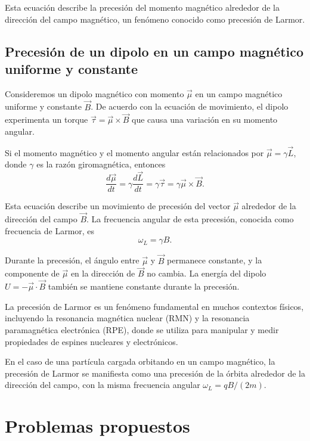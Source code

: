 \documentclass[12pt,a4paper]{book}
\begin{document}
Esta ecuación describe la precesión del momento magnético alrededor de la dirección del campo magnético, un fenómeno conocido como precesión de Larmor.

\subsection{Precesión de un dipolo en un campo magnético uniforme y constante}

Consideremos un dipolo magnético con momento $\vec{\mu}$ en un campo magnético uniforme y constante $\vec{B}$. De acuerdo con la ecuación de movimiento, el dipolo experimenta un torque $\vec{\tau} = \vec{\mu} \times \vec{B}$ que causa una variación en su momento angular.

Si el momento magnético y el momento angular están relacionados por $\vec{\mu} = \gamma \vec{L}$, donde $\gamma$ es la razón giromagnética, entonces
\begin{equation}
\frac{d\vec{\mu}}{dt} = \gamma \frac{d\vec{L}}{dt} = \gamma \vec{\tau} = \gamma \vec{\mu} \times \vec{B}.
\end{equation}

Esta ecuación describe un movimiento de precesión del vector $\vec{\mu}$ alrededor de la dirección del campo $\vec{B}$. La frecuencia angular de esta precesión, conocida como frecuencia de Larmor, es
\begin{equation}
\omega_L = \gamma B.
\end{equation}

Durante la precesión, el ángulo entre $\vec{\mu}$ y $\vec{B}$ permanece constante, y la componente de $\vec{\mu}$ en la dirección de $\vec{B}$ no cambia. La energía del dipolo $U = -\vec{\mu} \cdot \vec{B}$ también se mantiene constante durante la precesión.

La precesión de Larmor es un fenómeno fundamental en muchos contextos físicos, incluyendo la resonancia magnética nuclear (RMN) y la resonancia paramagnética electrónica (RPE), donde se utiliza para manipular y medir propiedades de espines nucleares y electrónicos.

En el caso de una partícula cargada orbitando en un campo magnético, la precesión de Larmor se manifiesta como una precesión de la órbita alrededor de la dirección del campo, con la misma frecuencia angular $\omega_L = qB/(2m)$.

\section{Problemas propuestos}
\end{document}
